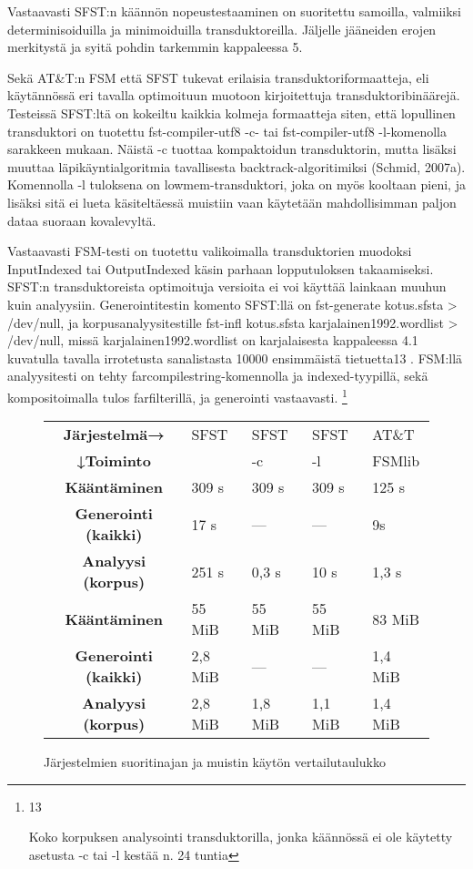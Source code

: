 \documentclass[free]{flammie}
\begin{document}
Vastaavasti SFST:n käännön nopeustestaaminen on suoritettu samoilla, valmiiksi determinisoiduilla ja minimoiduilla transduktoreilla. Jäljelle jääneiden erojen
merkitystä ja syitä pohdin tarkemmin kappaleessa 5.

Sekä AT\&T:n FSM että SFST tukevat erilaisia transduktoriformaatteja, eli käytännössä eri tavalla optimoituun muotoon kirjoitettuja transduktoribinäärejä. Testeissä SFST:ltä on kokeiltu kaikkia kolmeja formaatteja siten, että lopullinen transduktori on tuotettu fst-compiler-utf8 -c- tai fst-compiler-utf8
-l-komenolla sarakkeen mukaan. Näistä -c tuottaa kompaktoidun transduktorin, mutta lisäksi muuttaa läpikäyntialgoritmia tavallisesta backtrack-algoritimiksi
(Schmid, 2007a). Komennolla -l tuloksena on lowmem-transduktori, joka on
myös kooltaan pieni, ja lisäksi sitä ei lueta käsiteltäessä muistiin vaan käytetään
mahdollisimman paljon dataa suoraan kovalevyltä.

Vastaavasti FSM-testi on tuotettu valikoimalla transduktorien muodoksi InputIndexed tai OutputIndexed käsin parhaan lopputuloksen takaamiseksi. SFST:n transduktoreista optimoituja versioita ei voi käyttää lainkaan muuhun kuin analyysiin.
Generointitestin komento SFST:llä on fst-generate kotus.sfsta
> /dev/null, ja korpusanalyysitestille fst-infl kotus.sfsta
karjalainen1992.wordlist > /dev/null,
missä
karjalainen1992.wordlist on karjalaisesta kappaleessa 4.1 kuvatulla tavalla irrotetusta sanalistasta 10000 ensimmäistä tietuetta13 . FSM:llä analyysitesti
on tehty farcompilestring-komennolla ja indexed-tyypillä, sekä kompositoimalla tulos farfilterillä, ja generointi vastaavasti.
\footnote{
13

Koko korpuksen analysointi transduktorilla, jonka käännössä ei ole käytetty asetusta -c tai -l
kestää n. 24 tuntia
}

\begin{figure}
    \caption{Järjestelmien suoritinajan ja muistin käytön vertailutaulukko}
    \begin{tabular}{c|l|l|l||l}
        \hline
        \hline
        \bf Järjestelmä→ & SFST & SFST & SFST & AT\&T \\
        \bf ↓Toiminto & & -c & -l & FSMlib \\
        \hline
        \bf Kääntäminen & 309 s & 309 s & 309 s & 125 s \\
        \hline
        \bf Generointi (kaikki) & 17 s & — & — & 9s \\
        \bf Analyysi (korpus) & 251 s & 0,3 s & 10 s & 1,3 s \\
        \hline
        \hline
        \bf Kääntäminen & 55 MiB & 55 MiB & 55 MiB & 83 MiB \\
        \hline
        \bf Generointi (kaikki) & 2,8 MiB & — & — & 1,4 MiB \\
        \bf Analyysi (korpus) & 2,8 MiB & 1,8 MiB & 1,1 MiB & 1,4 MiB \\
        \hline
    \end{tabular}
\end{figure}
\end{document}
